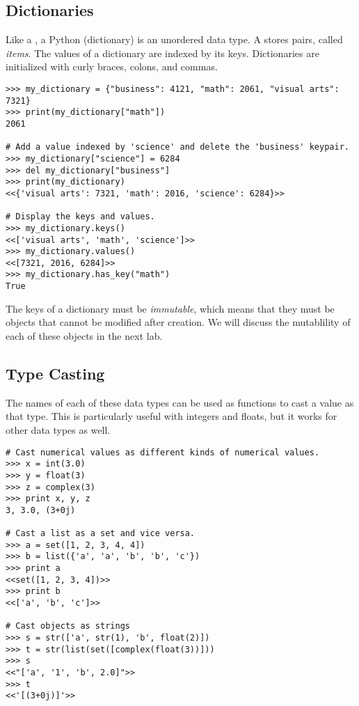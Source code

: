 
\subsection*{Dictionaries}
Like a , a Python  (dictionary) is an unordered data type.
A  stores  pairs, called \emph{items}.
The values of a dictionary are indexed by its keys.
Dictionaries are initialized with curly braces, colons, and commas.
\begin{lstlisting}
>>> my_dictionary = {"business": 4121, "math": 2061, "visual arts": 7321} 
>>> print(my_dictionary["math"])
2061

# Add a value indexed by 'science' and delete the 'business' keypair.
>>> my_dictionary["science"] = 6284
>>> del my_dictionary["business"]
>>> print(my_dictionary)
<<{'visual arts': 7321, 'math': 2016, 'science': 6284}>>

# Display the keys and values.
>>> my_dictionary.keys()
<<['visual arts', 'math', 'science']>>
>>> my_dictionary.values()
<<[7321, 2016, 6284]>>
>>> my_dictionary.has_key("math")
True
\end{lstlisting}

The keys of a dictionary must be \emph{immutable}, which means that they must be objects that cannot be modified after creation.
We will discuss the mutablility of each of these objects in the next lab.

\subsection*{Type Casting}

The names of each of these data types can be used as functions to cast a value as that type.
This is particularly useful with integers and floats, but it works for other data types as well.
\begin{lstlisting}
# Cast numerical values as different kinds of numerical values.
>>> x = int(3.0)
>>> y = float(3)
>>> z = complex(3)
>>> print x, y, z
3, 3.0, (3+0j)

# Cast a list as a set and vice versa.
>>> a = set([1, 2, 3, 4, 4])
>>> b = list({'a', 'a', 'b', 'b', 'c'})
>>> print a
<<set([1, 2, 3, 4])>>
>>> print b
<<['a', 'b', 'c']>>

# Cast objects as strings
>>> s = str(['a', str(1), 'b', float(2)])
>>> t = str(list(set([complex(float(3))]))
>>> s
<<"['a', '1', 'b', 2.0]">>
>>> t
<<'[(3+0j)]'>>

\end{lstlisting}

